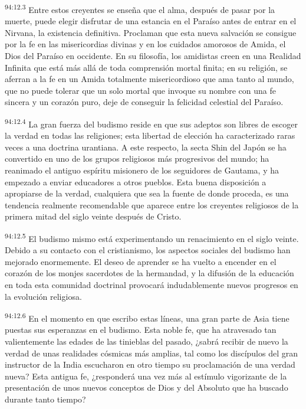 \par
\textsuperscript{94:12.3} Entre estos creyentes se enseña que el alma, después de pasar por la muerte, puede elegir disfrutar de una estancia en el Paraíso antes de entrar en el Nirvana, la existencia definitiva. Proclaman que esta nueva salvación se consigue por la fe en las misericordias divinas y en los cuidados amorosos de Amida, el Dios del Paraíso en occidente. En su filosofía, los amidistas creen en una Realidad Infinita que está más allá de toda comprensión mortal finita; en su religión, se aferran a la fe en un Amida totalmente misericordioso que ama tanto al mundo, que no puede tolerar que un solo mortal que invoque su nombre con una fe sincera y un corazón puro, deje de conseguir la felicidad celestial del Paraíso.

\par
\textsuperscript{94:12.4} La gran fuerza del budismo reside en que sus adeptos son libres de escoger la verdad en todas las religiones; esta libertad de elección ha caracterizado raras veces a una doctrina urantiana. A este respecto, la secta Shin del Japón se ha convertido en uno de los grupos religiosos más progresivos del mundo; ha reanimado el antiguo espíritu misionero de los seguidores de Gautama, y ha empezado a enviar educadores a otros pueblos. Esta buena disposición a apropiarse de la verdad, cualquiera que sea la fuente de donde proceda, es una tendencia realmente recomendable que aparece entre los creyentes religiosos de la primera mitad del siglo veinte después de Cristo.

\par
\textsuperscript{94:12.5} El budismo mismo está experimentando un renacimiento en el siglo veinte. Debido a su contacto con el cristianismo, los aspectos sociales del budismo han mejorado enormemente. El deseo de aprender se ha vuelto a encender en el corazón de los monjes sacerdotes de la hermandad, y la difusión de la educación en toda esta comunidad doctrinal provocará indudablemente nuevos progresos en la evolución religiosa.

\par
\textsuperscript{94:12.6} En el momento en que escribo estas líneas, una gran parte de Asia tiene puestas sus esperanzas en el budismo. Esta noble fe, que ha atravesado tan valientemente las edades de las tinieblas del pasado, ¿sabrá recibir de nuevo la verdad de unas realidades cósmicas más amplias, tal como los discípulos del gran instructor de la India escucharon en otro tiempo su proclamación de una verdad nueva? Esta antigua fe, ¿responderá una vez más al estímulo vigorizante de la presentación de unos nuevos conceptos de Dios y del Absoluto que ha buscado durante tanto tiempo?

